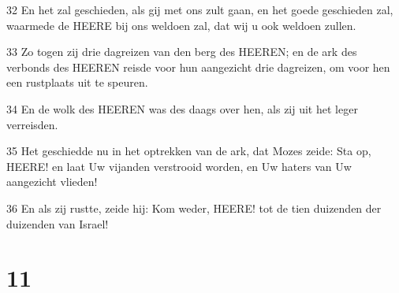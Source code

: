 \par 32 En het zal geschieden, als gij met ons zult gaan, en het goede geschieden zal, waarmede de HEERE bij ons weldoen zal, dat wij u ook weldoen zullen.
\par 33 Zo togen zij drie dagreizen van den berg des HEEREN; en de ark des verbonds des HEEREN reisde voor hun aangezicht drie dagreizen, om voor hen een rustplaats uit te speuren.
\par 34 En de wolk des HEEREN was des daags over hen, als zij uit het leger verreisden.
\par 35 Het geschiedde nu in het optrekken van de ark, dat Mozes zeide: Sta op, HEERE! en laat Uw vijanden verstrooid worden, en Uw haters van Uw aangezicht vlieden!
\par 36 En als zij rustte, zeide hij: Kom weder, HEERE! tot de tien duizenden der duizenden van Israel!

\chapter{11}


